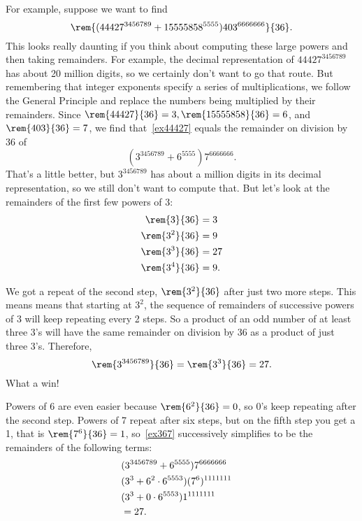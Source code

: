 For example, suppose we want to find
\begin{equation}\label{ex44427}
\rem{(44427^{3456789} + 15555858^{5555})403^{6666666}}{36}.
\end{equation}
This looks really daunting if you think about computing these large
powers and then taking remainders.  For example, the decimal
representation of $44427^{3456789}$ has about 20 million digits, so we
certainly don't want to go that route.  But remembering that integer
exponents specify a series of multiplications, we follow the General
Principle and replace the numbers being multiplied by their
remainders.  Since $\rem{44427}{36} = 3, \rem{15555858}{36} = 6$, and
$\rem{403}{36} = 7$, we find that~\eqref{ex44427} equals the remainder
on division by 36 of
\begin{equation}\label{ex367}
(3^{3456789} + 6^{5555})7^{6666666}.
\end{equation}
That's a little better, but $3^{3456789}$ has about a million digits
in its decimal representation, so we still don't want to compute that.
But let's look at the remainders of the first few powers of 3:
\begin{align*}
\rem{3}{36} & = 3\\
\rem{3^2}{36} & = 9\\
\rem{3^3}{36} & = 27\\
\rem{3^4}{36} & = 9.
\end{align*}

We got a repeat of the second step, $\rem{3^2}{36}$ after just two
more steps.  This means means that starting at $3^2$, the sequence of
remainders of successive powers of 3 will keep repeating every 2
steps.  So a product of an odd number of at least three 3's will have
the same remainder on division by 36 as a product of just three 3's.
Therefore,
\[
\rem{3^{3456789}}{36} = \rem{3^3}{36} = 27.
\]
What a win!

Powers of 6 are even easier because $\rem{6^2}{36} = 0$, so 0's keep
repeating after the second step.  Powers of 7 repeat after six
steps, but on the fifth step you get a 1, that is $\rem{7^6}{36}
=1$, so~\eqref{ex367} successively simplifies to be the remainders
of the following terms:
\begin{align*}
\lefteqn{(3^{3456789} + 6^{5555})7^{6666666}}\\
   & (3^3 + 6^2 \cdot 6^{5553})(7^6)^{1111111}\\
   & (3^3 + 0 \cdot 6^{5553})1^{1111111}\\
   & = 27.
\end{align*}

